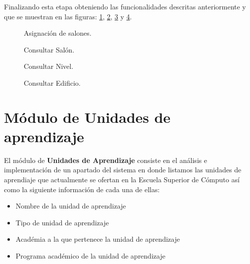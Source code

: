 Finalizando esta etapa obteniendo las funcionalidades descritas anteriormente y que se muestran en las figuras: \ref{S1}, \ref{S2}, \ref{S3} y \ref{S4}. \\

\begin{figure}[h!]
	\begin{center}
		\caption{Asignación de salones.}
		\label{S1}
	\end{center}
\end{figure}\begin{figure}[h!]
	\begin{center}
		\caption{Consultar  Salón.}
		\label{S2}
	\end{center}
\end{figure}\begin{figure}[h!]
	\begin{center}
		\caption{Consultar Nivel.}
		\label{S3}
	\end{center}
\end{figure}\begin{figure}[h!]
	\begin{center}
		\caption{Consultar Edificio.}
		\label{S4}
	\end{center}
\end{figure}

\section{Módulo de Unidades de aprendizaje}
El módulo de \textbf{Unidades de Aprendizaje} consiste en el análisis e implementación de un apartado del sistema en donde listamos las unidades de aprendiaje que actualmente se ofertan en la Escuela Superior de Cómputo así como la siguiente información de cada una de ellas:
\begin{itemize}
	\item Nombre de la unidad de aprendizaje
	\item Tipo de unidad de aprendizaje
	\item Académia a la que pertenece la unidad de aprendizaje
	\item Programa académico de la unidad de aprendizaje
\end{itemize}  

